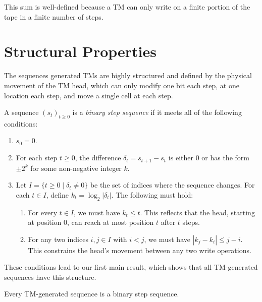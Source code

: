 This sum is well-defined because a TM can only write on a finite portion of the tape in a finite number of steps.

\chapter{Structural Properties}

The sequences generated TMs are highly structured and defined by the physical movement of the TM head, which can only modify one bit each step, at one location each step, and move a single cell at each step.

\begin{definition}
\label{def:binary_step_sequence}
\leanok
{}
A sequence $(s_t)_{t\geq0}$ is a \emph{binary step sequence} if it meets all of the following conditions:
\begin{enumerate}
\item $s_0 = 0$.
\item For each step $t \geq 0$, the difference $\delta_t = s_{t+1} - s_t$ is either $0$ or has the form $\pm 2^k$ for some non-negative integer $k$.
\item Let $I = \{t \geq 0 \mid \delta_t \neq 0\}$ be the set of indices where the sequence changes. For each $t \in I$, define $k_t = \log_2 |\delta_t|$. The following must hold:
    \begin{enumerate}
    \item For every $t \in I$, we must have $k_t \leq t$. This reflects that the head, starting at position 0, can reach at most position $t$ after $t$ steps.
    \item For any two indices $i, j \in I$ with $i < j$, we must have $|k_j - k_i| \leq j - i$. This constrains the head's movement between any two write operations.
    \end{enumerate}
\end{enumerate}
\end{definition}

These conditions lead to our first main result, which shows that all TM-generated sequences have this structure.

\begin{theorem}
\label{thm:forward_characterization}
\leanok
{}
Every TM-generated sequence is a binary step sequence.
\end{theorem}

